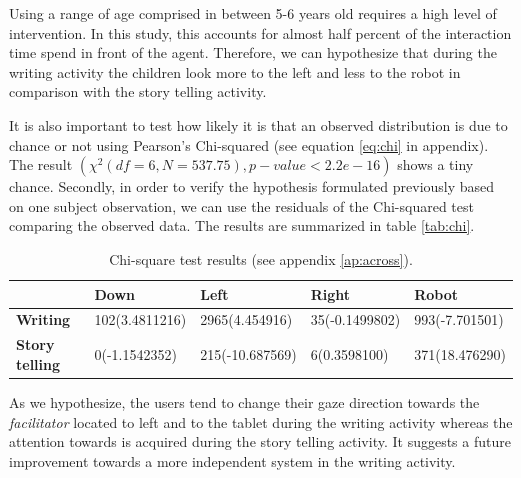 Using a range of age comprised in between 5-6 years old requires a high level of intervention. In this study, this accounts for almost half percent of the interaction time spend in front of the agent. Therefore, we can hypothesize that during the writing activity the children look more to the left and less to the robot in comparison with the story telling activity.

It is also important to test how likely it is that an observed distribution is due to chance or not using Pearson's Chi-squared (see equation \ref{eq:chi} in appendix). The result $(\chi^2(df=6,  N=537.75), p-value < 2.2e-16)$ shows a tiny chance. Secondly, in order to verify the hypothesis formulated previously based on one subject observation, we can use the residuals of the Chi-squared test comparing the observed data. The results are summarized in table \ref{tab:chi}.

\begin{table}[h!]
\centering
\begin{tabular}{l|l|l|l|l}
 		 		  & \textbf{Down} & \textbf{Left}	& \textbf{Right} & \textbf{Robot}	    \\ \hline	
 \textbf{Writing} &  102(3.4811216) & 2965(4.454916) & 35(-0.1499802)  &  993(-7.701501)    \\ \hline
 \textbf{Story telling}    &    0(-1.1542352) & 215(-10.687569)      & 6(0.3598100)      & 371(18.476290)
\end{tabular}
\caption{Chi-square test results (see appendix \ref{ap:across}).}
\end{table}\label{tab:chi}

As we hypothesize, the users tend to change their gaze direction towards the \textit{facilitator} located to left and to the tablet during the writing activity whereas the attention towards is acquired during the story telling activity. It suggests a future improvement towards a more independent system in the writing activity.

